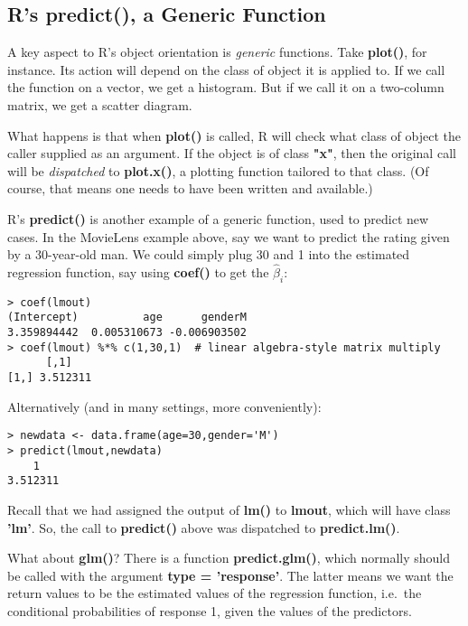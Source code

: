 \subsection{R's predict(), a Generic Function}

A key aspect to R's object orientation is \textit{generic} functions.
Take \textbf{plot()}, for instance.  Its action will depend on the class
of object it is applied to.  If we call the function on a vector, we get
a histogram.  But if we call it on a two-column matrix, we get a scatter
diagram.

What happens is that when \textbf{plot()} is called, R will check what
class of object the caller supplied as an argument.  If the object is of
class \textbf{"x"}, then the original call will be \textit{dispatched}
to \textbf{plot.x()}, a plotting function tailored to that class.  (Of
course, that means one needs to have been written and available.)

R's \textbf{predict()} is another example of a generic function, used to
predict new cases.  In the MovieLens example above, say we want to
predict the rating given by a 30-year-old man.  We could simply plug
30 and 1 into the estimated regression function, say using
\textbf{coef()} to get the $\widehat{\beta}_i$:

\begin{lstlisting}
> coef(lmout)
(Intercept)          age      genderM 
3.359894442  0.005310673 -0.006903502 
> coef(lmout) %*% c(1,30,1)  # linear algebra-style matrix multiply
      [,1]
[1,] 3.512311
\end{lstlisting}

Alternatively (and in many settings, more conveniently):

\begin{lstlisting}
> newdata <- data.frame(age=30,gender='M')
> predict(lmout,newdata)
    1 
3.512311 
\end{lstlisting}

Recall that we had assigned the output of \textbf{lm()} to
\textbf{lmout}, which will have class \textbf{'lm'}.  So, the call to
\textbf{predict()} above was dispatched to \textbf{predict.lm()}.

What about \textbf{glm()}?  There is a function \textbf{predict.glm()},
which normally should be called with the argument \textbf{type =
'response'}.  The latter means we want the return values to be the
estimated values of the regression function, i.e.\ the conditional
probabilities of response 1, given the values of the predictors.

